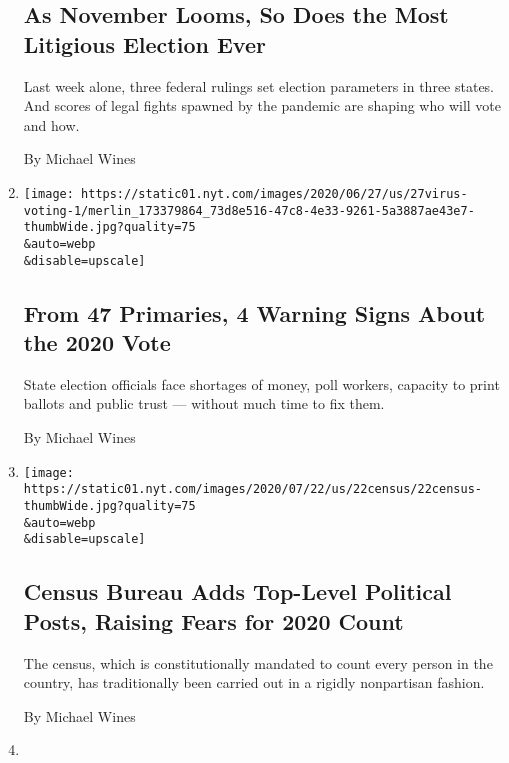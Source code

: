 \begin{enumerate}
{  \subsection{As November Looms, So Does the Most Litigious Election
  Ever}\label{as-november-looms-so-does-the-most-litigious-election-ever}}

  Last week alone, three federal rulings set election parameters in
  three states. And scores of legal fights spawned by the pandemic are
  shaping who will vote and how.

  By Michael Wines
\item
  \href{/2020/06/27/us/2020-primary-election-voting.html}{}

  \texttt{[image: https://static01.nyt.com/images/2020/06/27/us/27virus-voting-1/merlin\_173379864\_73d8e516-47c8-4e33-9261-5a3887ae43e7-thumbWide.jpg?quality=75\\\&auto=webp\\\&disable=upscale]}

  \hypertarget{from-47-primaries-4-warning-signs-about-the-2020-vote}{%
  \subsection{From 47 Primaries, 4 Warning Signs About the 2020
  Vote}\label{from-47-primaries-4-warning-signs-about-the-2020-vote}}

  State election officials face shortages of money, poll workers,
  capacity to print ballots and public trust --- without much time to
  fix them.

  By Michael Wines
\item
  \href{/2020/06/23/us/census-bureau-cogley-korzeniewski.html}{}

  \texttt{[image: https://static01.nyt.com/images/2020/07/22/us/22census/22census-thumbWide.jpg?quality=75\\\&auto=webp\\\&disable=upscale]}

  \hypertarget{census-bureau-adds-top-level-political-posts-raising-fears-for-2020-count}{%
  \subsection{Census Bureau Adds Top-Level Political Posts, Raising
  Fears for 2020
  Count}\label{census-bureau-adds-top-level-political-posts-raising-fears-for-2020-count}}

  The census, which is constitutionally mandated to count every person
  in the country, has traditionally been carried out in a rigidly
  nonpartisan fashion.

  By Michael Wines
\item
  \href{/2020/06/14/us/voter-registration-coronavirus-2020-election.html}{}


\end{enumerate}
